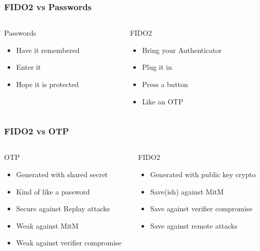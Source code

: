 \documentclass{beamer}
\begin{document}
\begin{frame}[fragile]
  \frametitle{FIDO2 vs Passwords}
  \begin{columns}
    \begin{column}{0.5\textwidth}
      Passwords
      \begin{itemize}
        \item Have it remembered
        \item Enter it
        \item Hope it is protected
      \end{itemize}
    \end{column}
    \pause
    \begin{column}{0.5\textwidth}
      FIDO2
      \begin{itemize}
        \item Bring your Authenticator
        \item Plug it in
        \item Press a button
        \item Like an OTP
      \end{itemize}
    \end{column}
  \end{columns}
\end{frame}

\begin{frame}[fragile]
  \frametitle{FIDO2 vs OTP}
  \begin{columns}
    \begin{column}{0.5\textwidth}
      OTP
      \begin{itemize}
        \item Generated with shared secret
        \item Kind of like a password
        \item Secure against Replay attacks
        \item Weak against MitM
        \item Weak against verifier compromise
      \end{itemize}
    \end{column}
    \pause
    \begin{column}{0.5\textwidth}
      FIDO2
      \begin{itemize}
        \item Generated with public key crypto
        \item Save(ish) against MitM
        \item Save against verifier compromise
        \item Save against remote attacks
      \end{itemize}
    \end{column}
  \end{columns}
\end{frame}
\end{document}
